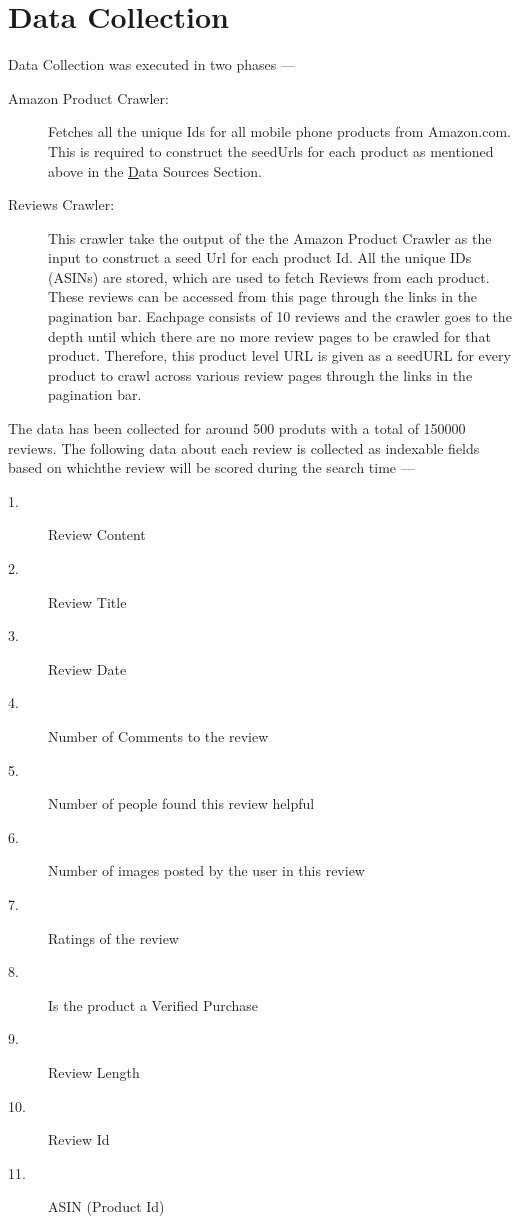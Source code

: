 \documentclass{article}
\begin{document}
\section{Data Collection}

Data Collection was executed in two phases ---

\begin{description}
	\item[Amazon Product Crawler: ] Fetches all the unique Ids for all mobile phone products from Amazon.com. This is required to construct the seedUrls for each product as mentioned above in the \hyperref[sec:dataSources] Data Sources Section.
	\item[Reviews Crawler: ] This crawler take the output of the the Amazon Product Crawler as the input to construct a seed Url for each product Id. All the unique IDs (ASINs) are stored, which are used to fetch Reviews from each product. These reviews can be accessed from this page through the links in the pagination bar. Eachpage consists of 10 reviews and the crawler goes to the depth until which there are no more review pages to be crawled for that product. Therefore, this product level URL is given as a seedURL for every product to crawl across various review pages through the links in the pagination bar.
\end{description}

The data has been collected for around 500 produts with a total of 150000 reviews. The following data about each review is collected as indexable fields based on whichthe review will be scored during the search time ---

\begin{description}
	\item[1. ] Review Content
	\item[2. ] Review Title
	\item[3. ] Review Date
	\item[4. ] Number of Comments to the review
	\item[5. ] Number of people found this review helpful
	\item[6. ] Number of images posted by the user in this review
	\item[7. ] Ratings of the review 
	\item[8. ] Is the product a Verified Purchase
	\item[9. ] Review Length
	\item[10. ] Review Id
	\item[11. ] ASIN (Product Id)
\end{description}
\end{document}
